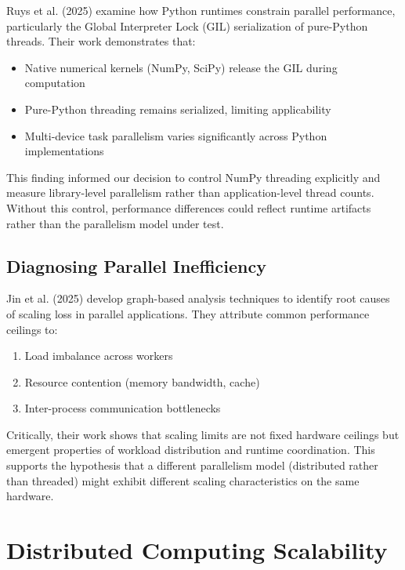 Ruys et al. (2025) \cite{ruys2025performance} examine how Python runtimes constrain parallel performance, particularly the Global Interpreter Lock (GIL) serialization of pure-Python threads. Their work demonstrates that:

\begin{itemize}
    \item Native numerical kernels (NumPy, SciPy) release the GIL during computation
    \item Pure-Python threading remains serialized, limiting applicability
    \item Multi-device task parallelism varies significantly across Python implementations
\end{itemize}

This finding informed our decision to control NumPy threading explicitly and measure library-level parallelism rather than application-level thread counts. Without this control, performance differences could reflect runtime artifacts rather than the parallelism model under test.

\subsection{Diagnosing Parallel Inefficiency}

Jin et al. (2025) \cite{jin2025leveraging} develop graph-based analysis techniques to identify root causes of scaling loss in parallel applications. They attribute common performance ceilings to:

\begin{enumerate}
    \item Load imbalance across workers
    \item Resource contention (memory bandwidth, cache)
    \item Inter-process communication bottlenecks
\end{enumerate}

Critically, their work shows that scaling limits are not fixed hardware ceilings but emergent properties of workload distribution and runtime coordination. This supports the hypothesis that a different parallelism model (distributed rather than threaded) might exhibit different scaling characteristics on the same hardware.

\section{Distributed Computing Scalability}

